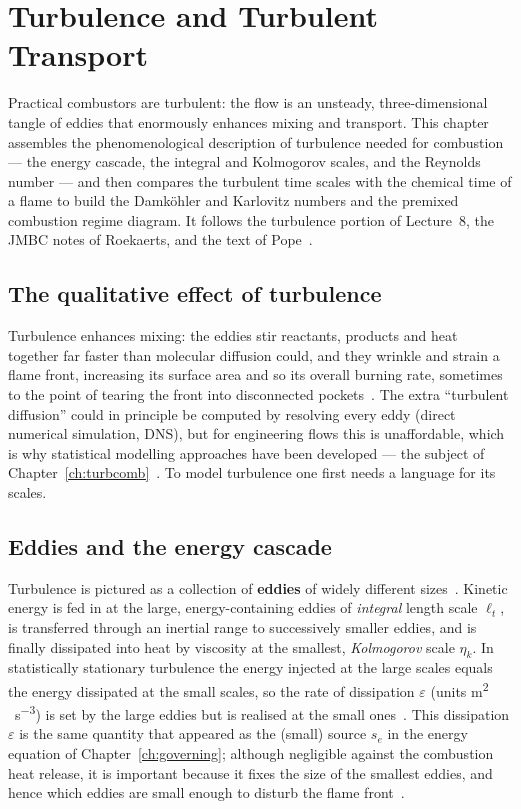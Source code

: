 \chapter{Turbulence and Turbulent Transport}\label{ch:turbulence}

Practical combustors are turbulent: the flow is an unsteady, three-dimensional tangle of eddies that enormously enhances mixing and transport. This chapter assembles the phenomenological description of turbulence needed for combustion --- the energy cascade, the integral and Kolmogorov scales, and the Reynolds number --- and then compares the turbulent time scales with the chemical time of a flame to build the Damk\"ohler and Karlovitz numbers and the premixed combustion regime diagram. It follows the turbulence portion of Lecture~8, the JMBC notes of Roekaerts, and the text of Pope~\cite{lecture8,roekaerts2010jmbc,pope2000turbulent}.

\section{The qualitative effect of turbulence}

Turbulence enhances mixing: the eddies stir reactants, products and heat together far faster than molecular diffusion could, and they wrinkle and strain a flame front, increasing its surface area and so its overall burning rate, sometimes to the point of tearing the front into disconnected pockets~\cite{lecture8,lecture4}. The extra ``turbulent diffusion'' could in principle be computed by resolving every eddy (direct numerical simulation, DNS), but for engineering flows this is unaffordable, which is why statistical modelling approaches have been developed --- the subject of Chapter~\ref{ch:turbcomb}~\cite{lecture8}. To model turbulence one first needs a language for its scales.

\section{Eddies and the energy cascade}

Turbulence is pictured as a collection of \textbf{eddies} of widely different sizes~\cite{lecture8,pope2000turbulent}. Kinetic energy is fed in at the large, energy-containing eddies of \emph{integral} length scale $\ell_t$, is transferred through an inertial range to successively smaller eddies, and is finally dissipated into heat by viscosity at the smallest, \emph{Kolmogorov} scale $\eta_k$. In statistically stationary turbulence the energy injected at the large scales equals the energy dissipated at the small scales, so the rate of dissipation $\varepsilon$ (units \si{m^2\,s^{-3}}) is set by the large eddies but is realised at the small ones~\cite{lecture8,pope2000turbulent}. This dissipation $\varepsilon$ is the same quantity that appeared as the (small) source $s_e$ in the energy equation of Chapter~\ref{ch:governing}; although negligible against the combustion heat release, it is important because it fixes the size of the smallest eddies, and hence which eddies are small enough to disturb the flame front~\cite{lecture8}.

